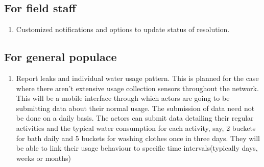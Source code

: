 \documentclass[paper=a4, fontsize=11pt]{scrartcl} %
\numberwithin{equation}{section} %
\numberwithin{figure}{section} %
\numberwithin{table}{section} %
\begin{document}
\subsection{For field staff}
\begin{enumerate}
\item
Customized notifications and options to update status of resolution.
\end{enumerate}

\subsection{For general populace}
\begin{enumerate}
\item
Report leaks and individual water usage pattern.
\newline
This is planned for the case where there aren't extensive usage collection sensors throughout the network. This will be a mobile interface through which actors are going to be submitting data about their normal usage. The submission of data need not be done on a daily basis. The actors can submit data detailing their regular activities and the typical water consumption for each activity, say, 2 buckets for bath daily and 5 buckets for washing clothes once in three days. They will be able to link their usage behaviour to specific time intervals(typically days, weeks or months)
\end{enumerate}
\end{document}
